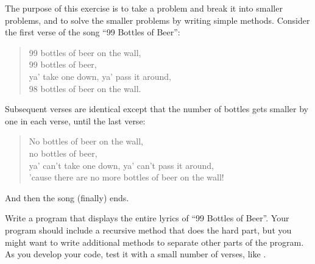 \begin{exercise}  %

The purpose of this exercise is to take a problem and break it into smaller problems, and to solve the smaller problems by writing simple methods.
Consider the first verse of the song ``99 Bottles of Beer'':

\begin{quote}
99 bottles of beer on the wall,\\
99 bottles of beer,\\
ya' take one down, ya' pass it around,\\
98 bottles of beer on the wall.
\end{quote}

Subsequent verses are identical except that the number of bottles gets smaller by one in each verse, until the last verse:

\begin{quote}
No bottles of beer on the wall,\\
no bottles of beer,\\
ya' can't take one down, ya' can't pass it around,\\
'cause there are no more bottles of beer on the wall!
\end{quote}

And then the song (finally) ends.

Write a program that displays the entire lyrics of ``99 Bottles of Beer''.
Your program should include a recursive method that does the hard part, but you might want to write additional methods to separate other parts of the program.
As you develop your code, test it with a small number of verses, like .

\end{exercise}



